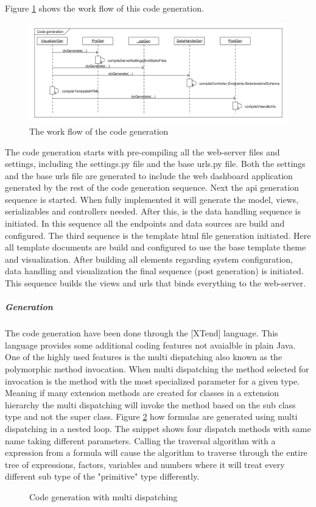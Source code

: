 Figure \ref{fig:codegen} shows the work flow of this code generation.
\begin{figure}
\begin{center}
\includegraphics[width=\linewidth]{images/codegeneration}
\end{center}
\caption{The work flow of the code generation}
\label{fig:codegen}
\end{figure}
The code generation starts with pre-compiling all the web-server files and settings,
including the settings.py file and the base urls.py file.
Both the settings and the base urls file are generated to include the web dashboard application
generated by the rest of the code generation sequence.
Next the api generation sequence is started. When fully implemented it will generate the model,
views, serializables and controllers needed.
After this, is the data handling sequence is initiated. In this sequence all the endpoints and
data sources are build and configured.
The third sequence is the template html file generation initiated. Here all template documents
are build and configured to use the base template theme and visualization.
After building all elements regarding system configuration, data handling and visualization the
final sequence (post generation) is initiated.
This sequence builds the views and urls that binds everything to the web-server.

\subparagraph{Generation}
The code generation have been done through the [XTend] language.
This language provides some additional coding features not avaialble in plain Java.
One of the highly used features is the multi dispatching also known as the polymorphic
method invocation.
When multi dispatching the method selected for invocation is the method with the most
specialized parameter for a given type. 
Meaning if many extension methods are created for classes in a extension hierarchy the multi
dispatching will invoke the method based on the sub class type and not the super class.
Figure \ref{fig:multidispatching} how formulas are generated using multi dispatching in a
nested loop.
The snippet shows four dispatch methods with same name taking different parameters.
Calling the traversal algorithm with a expression from a formula will cause the algorithm to
traverse through the entire tree of expressions, factors, variables and numbers where it will
treat every different sub type of the "primitive" type differently.

\begin{figure}
\begin{center}

\end{center}
\caption{Code generation with multi dispatching}
\label{fig:multidispatching}
\end{figure}
